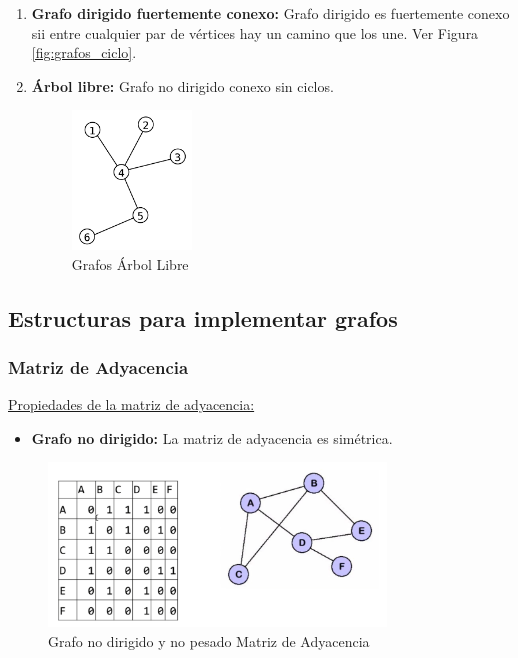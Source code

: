 \documentclass[../main.tex]{subfiles}
\begin{document}
\begin{enumerate}
        \item \textbf{Grafo dirigido fuertemente conexo:} Grafo dirigido es fuertemente conexo sii entre cualquier par de vértices hay un camino que los une. Ver Figura \ref{fig:grafos_ciclo}.
        
        \item \textbf{Árbol libre:} Grafo no dirigido conexo sin ciclos.
            \begin{figure}[ht]
                \centering
                \includegraphics[width=0.3\textwidth]{images/grafos/grafo_arbol_libre.png}
                \caption{Grafos Árbol Libre}
            \end{figure}
    \end{enumerate}
    
    \newpage

    \subsection{Estructuras para implementar grafos}

        \subsubsection{Matriz de Adyacencia}
            \underline{Propiedades de la matriz de adyacencia:}
            \begin{itemize}
                \item \textbf{Grafo no dirigido:} La matriz de adyacencia es simétrica.
            \end{itemize}

            \begin{figure}[ht]
                \centering
                \includegraphics[width=0.8\textwidth]{images/grafos/grafo_matriz_adyacencia_1.png}
                \caption{Grafo no dirigido y no pesado Matriz de Adyacencia} 
            \end{figure}
\end{document}

